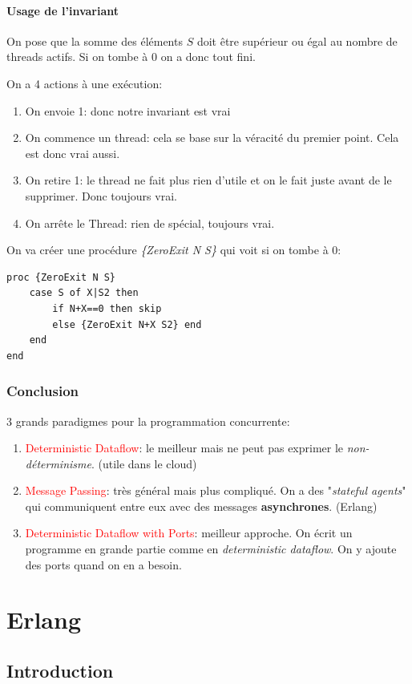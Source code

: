 \documentclass{report}
\begin{document}
\subsubsection{Usage de l'invariant}
On pose que la somme des éléments $S$ doit être supérieur ou égal au nombre de threads actifs. Si on tombe à $0$ on a donc tout fini.\par 
On a 4 actions à une exécution:
\begin{enumerate}
\item On envoie 1: donc notre invariant est vrai
\item On commence un thread: cela se base sur la véracité du premier point. Cela est donc vrai aussi.
\item On retire 1: le thread ne fait plus rien d'utile et on le fait juste avant de le supprimer. Donc toujours vrai.
\item On arrête le Thread: rien de spécial, toujours vrai.
\end{enumerate}
On va créer une procédure \textit{\{ZeroExit N S\}} qui voit si on tombe à 0:
\begin{lstlisting}[escapechar=\%]
proc {ZeroExit N S}
	case S of X|S2 then
		if N+X==0 then skip 
		else {ZeroExit N+X S2} end
	end
end
\end{lstlisting}

\subsection{Conclusion}
3 grands paradigmes pour la programmation concurrente:
\begin{enumerate}
\item \textcolor{red}{Deterministic Dataflow}: le meilleur mais ne peut pas exprimer le \textit{non-déterminisme}. (utile dans le cloud)
\item \textcolor{red}{Message Passing}: très général mais plus compliqué. On a des "\textit{stateful agents}" qui communiquent entre eux avec des messages \textbf{asynchrones}. (Erlang)
\item \textcolor{red}{Deterministic Dataflow with Ports}: meilleur approche. On écrit un programme en grande partie comme en \textit{deterministic dataflow}. On y ajoute des ports quand on en a besoin.
\end{enumerate}

\chapter{Erlang}
\section{Introduction}
\end{document}
